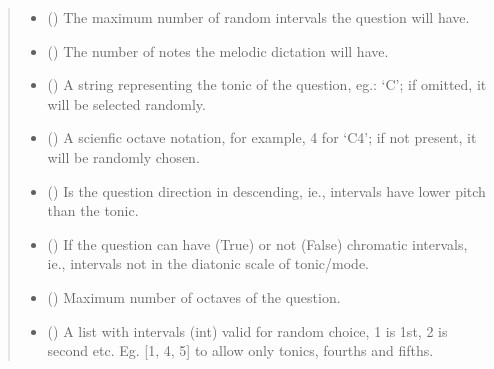 \documentclass[letterpaper,10pt,english]{sphinxmanual}
\begin{document}
\begin{fulllineitems}
\begin{fulllineitems}
\begin{quote}
\begin{description}
\begin{itemize}
\item {} 
 () \textendash{} The maximum number of random intervals
the question will have.

\item {} 
 () \textendash{} The number of notes the melodic dictation will have.

\item {} 
 () \textendash{} A string representing the tonic of the question,
eg.: ‘C’; if omitted, it will be selected randomly.

\item {} 
 () \textendash{} A scienfic octave notation, for example, 4 for ‘C4’;
if not present, it will be randomly chosen.

\item {} 
 () \textendash{} Is the question direction in descending, ie.,
intervals have lower pitch than the tonic.

\item {} 
 () \textendash{} If the question can have (True) or not (False)
chromatic intervals, ie., intervals not in the diatonic scale
of tonic/mode.

\item {} 
 () \textendash{} Maximum number of octaves of the question.

\item {} 
 () \textendash{} A list with intervals (int) valid for
random choice, 1 is 1st, 2 is second etc. Eg. {[}1, 4, 5{]} to
allow only tonics, fourths and fifths.


\end{itemize}
\end{description}
\end{quote}
\end{fulllineitems}
\end{fulllineitems}
\end{document}
